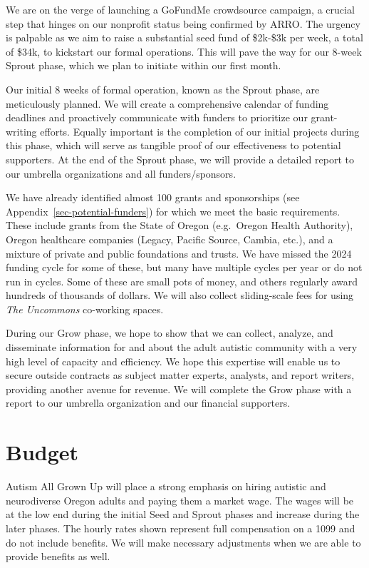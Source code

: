 \documentclass[
  letterpaper,
  DIV=11,
  numbers=noendperiod]{scrreprt}
\begin{document}
We are on the verge of launching a GoFundMe crowdsource campaign, a
crucial step that hinges on our nonprofit status being confirmed by
ARRO. The urgency is palpable as we aim to raise a substantial seed fund
of \$2k-\$3k per week, a total of \$34k, to kickstart our formal
operations. This will pave the way for our 8-week Sprout phase, which we
plan to initiate within our first month.

Our initial 8 weeks of formal operation, known as the Sprout phase, are
meticulously planned. We will create a comprehensive calendar of funding
deadlines and proactively communicate with funders to prioritize our
grant-writing efforts. Equally important is the completion of our
initial projects during this phase, which will serve as tangible proof
of our effectiveness to potential supporters. At the end of the Sprout
phase, we will provide a detailed report to our umbrella organizations
and all funders/sponsors.

We have already identified almost 100 grants and sponsorships (see
Appendix~\ref{sec-potential-funders}) for which we meet the basic
requirements. These include grants from the State of Oregon (e.g.~Oregon
Health Authority), Oregon healthcare companies (Legacy, Pacific Source,
Cambia, etc.), and a mixture of private and public foundations and
trusts. We have missed the 2024 funding cycle for some of these, but
many have multiple cycles per year or do not run in cycles. Some of
these are small pots of money, and others regularly award hundreds of
thousands of dollars. We will also collect sliding-scale fees for using
\emph{The Uncommons} co-working spaces.

During our Grow phase, we hope to show that we can collect, analyze, and
disseminate information for and about the adult autistic community with
a very high level of capacity and efficiency. We hope this expertise
will enable us to secure outside contracts as subject matter experts,
analysts, and report writers, providing another avenue for revenue. We
will complete the Grow phase with a report to our umbrella organization
and our financial supporters.


\chapter{Budget}\label{budget}

Autism All Grown Up will place a strong emphasis on hiring autistic and
neurodiverse Oregon adults and paying them a market wage. The wages will
be at the low end during the initial Seed and Sprout phases and increase
during the later phases. The hourly rates shown represent full
compensation on a 1099 and do not include benefits. We will make
necessary adjustments when we are able to provide benefits as well.
\end{document}
